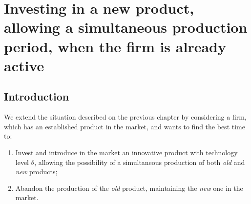 
\chapter{Investing in a new product, allowing a simultaneous production period, when the firm is already active}
\label{chapter:3}



\section{Introduction}
\label{section:3_intro}




We extend the situation described on the previous chapter by considering a firm, which has an established product in the market, and wants to find the best time to:
\begin{enumerate}
	\item Invest and introduce in the market an innovative product with technology level $\theta$, allowing the possibility of a simultaneous production of both \textit{old} and \textit{new} products;
	\item Abandon the production of the \textit{old} product, maintaining the \textit{new} one in the market.
\end{enumerate}

